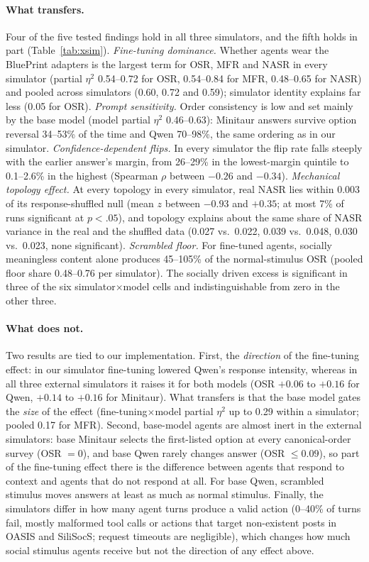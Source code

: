 \documentclass[letterpaper]{article} %
\begin{document}
\paragraph{What transfers.} Four of the five tested findings hold in all three simulators, and the fifth holds in part (Table~\ref{tab:xsim}).
\emph{Fine-tuning dominance.} Whether agents wear the BluePrint adapters is the largest term for OSR, MFR and NASR in every simulator (partial $\eta^2$ 0.54--0.72 for OSR, 0.54--0.84 for MFR, 0.48--0.65 for NASR) and pooled across simulators (0.60, 0.72 and 0.59); simulator identity explains far less (0.05 for OSR).
\emph{Prompt sensitivity.} Order consistency is low and set mainly by the base model (model partial $\eta^2$ 0.46--0.63): Minitaur answers survive option reversal 34--53\% of the time and Qwen 70--98\%, the same ordering as in our simulator.
\emph{Confidence-dependent flips.} In every simulator the flip rate falls steeply with the earlier answer's margin, from 26--29\% in the lowest-margin quintile to 0.1--2.6\% in the highest (Spearman $\rho$ between $-0.26$ and $-0.34$).
\emph{Mechanical topology effect.} At every topology in every simulator, real NASR lies within 0.003 of its response-shuffled null (mean $z$ between $-0.93$ and $+0.35$; at most 7\% of runs significant at $p<.05$), and topology explains about the same share of NASR variance in the real and the shuffled data (0.027 vs.\ 0.022, 0.039 vs.\ 0.048, 0.030 vs.\ 0.023, none significant).
\emph{Scrambled floor.} For fine-tuned agents, socially meaningless content alone produces 45--105\% of the normal-stimulus OSR (pooled floor share 0.48--0.76 per simulator). The socially driven excess is significant in three of the six simulator$\times$model cells and indistinguishable from zero in the other three.

\paragraph{What does not.} Two results are tied to our implementation. First, the \emph{direction} of the fine-tuning effect: in our simulator fine-tuning lowered Qwen's response intensity, whereas in all three external simulators it raises it for both models (OSR $+0.06$ to $+0.16$ for Qwen, $+0.14$ to $+0.16$ for Minitaur). What transfers is that the base model gates the \emph{size} of the effect (fine-tuning$\times$model partial $\eta^2$ up to 0.29 within a simulator; pooled 0.17 for MFR). Second, base-model agents are almost inert in the external simulators: base Minitaur selects the first-listed option at every canonical-order survey (OSR $=0$), and base Qwen rarely changes answer (OSR $\leq 0.09$), so part of the fine-tuning effect there is the difference between agents that respond to context and agents that do not respond at all. For base Qwen, scrambled stimulus moves answers at least as much as normal stimulus. Finally, the simulators differ in how many agent turns produce a valid action (0--40\% of turns fail, mostly malformed tool calls or actions that target non-existent posts in OASIS and SiliSocS; request timeouts are negligible), which changes how much social stimulus agents receive but not the direction of any effect above.
\end{document}
